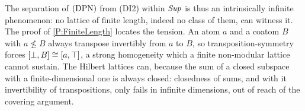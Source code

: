 \begin{remark}
  \label{Rem NSD Infinite}
  The separation of \(\textup{(DPN)}\) from \textup{(DI2)} within \(\mathit{Sup}\) is thus an intrinsically infinite phenomenon: no lattice of finite length, indeed no class of them, can witness it. The proof of \prox\ref{P:FiniteLength} locates the tension. An atom \(a\) and a coatom \(B\) with \(a\not\leq B\) always transpose invertibly from \(a\) to \(B\), so transposition-symmetry forces \([\bot,B]\cong[a,\top]\), a strong homogeneity which a finite non-modular lattice cannot sustain. The Hilbert lattices can, because the sum of a closed subspace with a finite-dimensional one is always closed: closedness of sums, and with it invertibility of transpositions, only fails in infinite dimensions, out of reach of the covering argument.
\end{remark}

